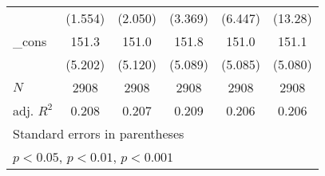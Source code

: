 {\begin{tabular}{l*{5}{c}}
            &     (1.554)         &     (2.050)         &     (3.369)         &     (6.447)         &     (13.28)         \\
[1em]
\_cons      &       151.3\sym{***}&       151.0\sym{***}&       151.8\sym{***}&       151.0\sym{***}&       151.1\sym{***}\\
            &     (5.202)         &     (5.120)         &     (5.089)         &     (5.085)         &     (5.080)         \\
\hline
\(N\)       &        2908         &        2908         &        2908         &        2908         &        2908         \\
adj. \(R^{2}\)&       0.208         &       0.207         &       0.209         &       0.206         &       0.206         \\
\hline\hline
\multicolumn{6}{l}{\footnotesize Standard errors in parentheses}\\
\multicolumn{6}{l}{\footnotesize \sym{*} \(p<0.05\), \sym{**} \(p<0.01\), \sym{***} \(p<0.001\)}\\
\end{tabular}
}
